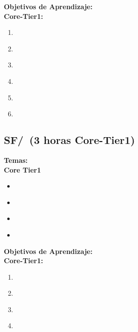 \noindent \textbf{Objetivos de Aprendizaje:}\\
\noindent \textbf{Core-Tier1:}
\begin{enumerate}
	\setcounter{enumi}{0}
	\item \SFParallelismLOForADistinguish\xspace[\SFParallelismLOForADistinguishLevel]\label{sec:BOK:SFParallelismLOForADistinguish}
	\item \SFParallelismLODemonstrateOn\xspace[\SFParallelismLODemonstrateOnLevel]\label{sec:BOK:SFParallelismLODemonstrateOn}
	\item \SFParallelismLOExplainOther\xspace[\SFParallelismLOExplainOtherLevel]\label{sec:BOK:SFParallelismLOExplainOther}
	\item \SFParallelismLODefineTheThe\xspace[\SFParallelismLODefineTheTheLevel]\label{sec:BOK:SFParallelismLODefineTheThe}
	\item \SFParallelismLOWriteMore\xspace[\SFParallelismLOWriteMoreLevel]\label{sec:BOK:SFParallelismLOWriteMore}
	\item \SFParallelismLOUsePerformance\xspace[\SFParallelismLOUsePerformanceLevel]\label{sec:BOK:SFParallelismLOUsePerformance}
\end{enumerate}


\subsection{SF/\SFEvaluation~(3 horas Core-Tier1)}\label{sec:BOK:SFEvaluation}
\noindent \textbf{Temas:}\\
\noindent \textbf{Core Tier1}
\begin{itemize}
	\item \SFEvaluationTopicPerformance\label{sec:BOK:SFEvaluationTopicPerformance}
	\item \SFEvaluationTopicWorkloads\label{sec:BOK:SFEvaluationTopicWorkloads}
	\item \SFEvaluationTopicCpi\label{sec:BOK:SFEvaluationTopicCpi}
	\item \SFEvaluationTopicAmdahls\label{sec:BOK:SFEvaluationTopicAmdahls}
\end{itemize}


\noindent \textbf{Objetivos de Aprendizaje:}\\
\noindent \textbf{Core-Tier1:}
\begin{enumerate}
	\setcounter{enumi}{0}
	\item \SFEvaluationLOExplainHowOfContribute\xspace[\SFEvaluationLOExplainHowOfContributeLevel]\label{sec:BOK:SFEvaluationLOExplainHowOfContribute}
	\item \SFEvaluationLODescribeAmdahls\xspace[\SFEvaluationLODescribeAmdahlsLevel]\label{sec:BOK:SFEvaluationLODescribeAmdahls}
	\item \SFEvaluationLODesignAndPerformance\xspace[\SFEvaluationLODesignAndPerformanceLevel]\label{sec:BOK:SFEvaluationLODesignAndPerformance}
	\item \SFEvaluationLOUseSoftware\xspace[\SFEvaluationLOUseSoftwareLevel]\label{sec:BOK:SFEvaluationLOUseSoftware}
\end{enumerate}


